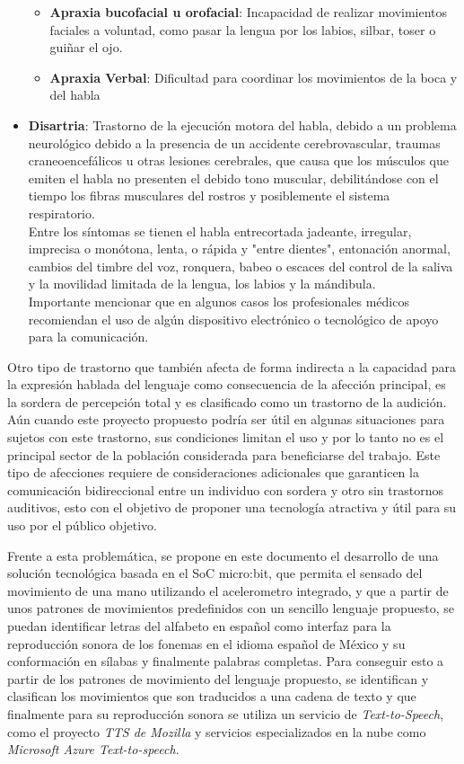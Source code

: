 \begin{itemize}
	\begin{itemize}
		\item \textbf{Apraxia bucofacial u orofacial}: Incapacidad de realizar movimientos faciales a voluntad, como pasar la lengua por los labios, silbar, toser o guiñar el ojo.
		\item \textbf{Apraxia Verbal}: Dificultad para coordinar los movimientos de la boca y del habla
	\end{itemize}
	\item \textbf{Disartria}: Trastorno de la ejecución motora del habla, debido a un problema neurológico debido a la presencia de un accidente cerebrovascular, traumas craneoencefálicos u otras lesiones cerebrales, que causa que los músculos que emiten el habla no presenten el debido tono muscular, debilitándose con el tiempo los fibras musculares del rostros y posiblemente el sistema respiratorio. \\ Entre los síntomas se tienen el habla entrecortada jadeante, irregular, imprecisa o monótona, lenta, o rápida y "entre dientes", entonación anormal, cambios del timbre del voz, ronquera, babeo o escaces del control de la saliva y la movilidad limitada de la lengua, los labios y la mándibula.\\ Importante mencionar que en algunos casos los profesionales médicos recomiendan el uso de algún dispositivo electrónico o tecnológico de apoyo para la comunicación.
\end{itemize}

\hfill \break
\justifying
Otro tipo de trastorno que también afecta de forma indirecta a la capacidad para la expresión hablada del lenguaje como consecuencia de la afección principal, es la sordera de percepción total y es clasificado como un trastorno de la audición. Aún cuando este proyecto propuesto podría ser útil en algunas situaciones para sujetos con este trastorno, sus condiciones limitan el uso y por lo tanto no es el principal sector de la población considerada para beneficiarse del trabajo. Este tipo de afecciones requiere de consideraciones adicionales que garanticen la comunicación bidireccional entre un individuo con sordera y otro sin trastornos auditivos, esto con el objetivo de proponer una tecnología atractiva y útil para su uso por el público objetivo.

\hfill \break
\justifying
Frente a esta problemática, se propone en este documento el desarrollo de una solución tecnológica basada en el SoC micro:bit, que permita el sensado del movimiento de una mano utilizando el acelerometro integrado, y que a partir de unos patrones de movimientos predefinidos con un sencillo lenguaje propuesto, se puedan identificar letras del alfabeto en español como interfaz para la reproducción sonora de los fonemas en el idioma español de México y su conformación en sílabas y finalmente palabras completas.
Para conseguir esto a partir de los patrones de movimiento del lenguaje propuesto, se identifican y clasifican los movimientos que son traducidos a una cadena de texto y que finalmente para su reproducción sonora se utiliza un servicio de \textit{Text-to-Speech}, como el proyecto \textit{TTS de Mozilla} y servicios especializados en la nube como \textit{Microsoft Azure Text-to-speech}.

